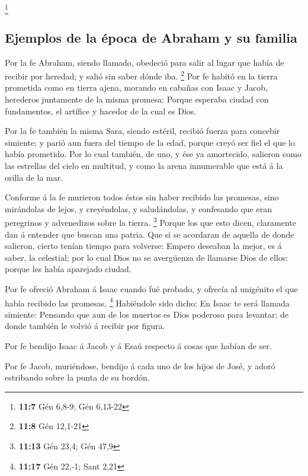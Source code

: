 \footnote{\textbf{11:7} Gén 6,8-9; Gén 6,13-22}

\hypertarget{ejemplos-de-la-uxe9poca-de-abraham-y-su-familia}{%
\subsection{Ejemplos de la época de Abraham y su
familia}\label{ejemplos-de-la-uxe9poca-de-abraham-y-su-familia}}

 Por la fe Abraham, siendo llamado, obedeció para salir al
lugar que había de recibir por heredad; y salió sin saber dónde iba.
\footnote{\textbf{11:8} Gén 12,1-21}  Por fe habitó en la
tierra prometida como en tierra ajena, morando en cabañas con Isaac y
Jacob, herederos juntamente de la misma promesa:  Porque
esperaba ciudad con fundamentos, el artífice y hacedor de la cual es
Dios.

 Por la fe también la misma Sara, siendo estéril, recibió
fuerza para concebir simiente; y parió aun fuera del tiempo de la edad,
porque creyó ser fiel el que lo había prometido.  Por lo
cual también, de uno, y ése ya amortecido, salieron como las estrellas
del cielo en multitud, y como la arena innumerable que está á la orilla
de la mar.

 Conforme á la fe murieron todos éstos sin haber recibido
las promesas, sino mirándolas de lejos, y creyéndolas, y saludándolas, y
confesando que eran peregrinos y advenedizos sobre la tierra.
\footnote{\textbf{11:13} Gén 23,4; Gén 47,9}  Porque los
que esto dicen, claramente dan á entender que buscan una patria.
 Que si se acordaran de aquella de donde salieron, cierto
tenían tiempo para volverse:  Empero deseaban la mejor, es
á saber, la celestial; por lo cual Dios no se avergüenza de llamarse
Dios de ellos: porque les había aparejado ciudad.

 Por fe ofreció Abraham á Isaac cuando fué probado, y
ofrecía al unigénito el que había recibido las promesas, \footnote{\textbf{11:17}
  Gén 22,-1; Sant 2,21}  Habiéndole sido dicho: En Isaac te
será llamada simiente:  Pensando que aun de los muertos es
Dios poderoso para levantar; de donde también le volvió á recibir por
figura.

 Por fe bendijo Isaac á Jacob y á Esaú respecto á cosas que
habían de ser.

 Por fe Jacob, muriéndose, bendijo á cada uno de los hijos
de José, y adoró estribando sobre la punta de su bordón.

